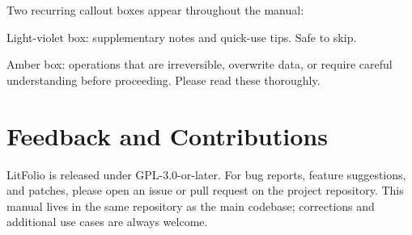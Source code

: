 Two recurring callout boxes appear throughout the manual:

\begin{tipbox}[Tip]
Light-violet box: supplementary notes and quick-use tips. Safe to skip.
\end{tipbox}

\begin{warnbox}[Warning]
Amber box: operations that are irreversible, overwrite data, or require careful
understanding before proceeding. Please read these thoroughly.
\end{warnbox}

\section*{Feedback and Contributions}

LitFolio is released under GPL-3.0-or-later. For bug reports, feature suggestions,
and patches, please open an issue or pull request on the project repository.
This manual lives in the same repository as the main codebase; corrections and
additional use cases are always welcome.
